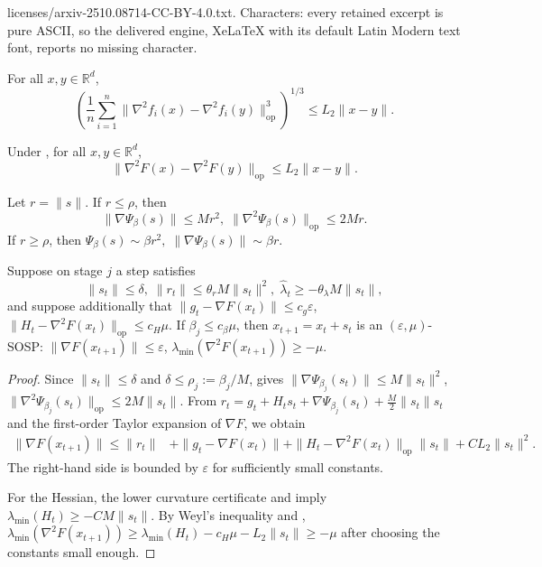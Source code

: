 \documentclass[10pt,a4paper]{amsart}
\begin{document}
licenses/arxiv-2510.08714-CC-BY-4.0.txt. Characters: every retained excerpt is pure ASCII, so the delivered engine, XeLaTeX with its default Latin Modern text font, reports no missing character.
\begin{assumption}\label{ass:H}
For all \(x,y\in\mathbb R^d\),
\[
\textstyle \left(\frac1n\sum_{i=1}^n
\|\nabla^2 f_i(x)-\nabla^2 f_i(y)\|_{\mathrm{op}}^3\right)^{1/3}
\le L_2\|x-y\|.
\]
\end{assumption}

\begin{lemma}\label{lem:hess-lip}
Under , for all \(x,y\in\mathbb R^d\),
\[
\|\nabla^2F(x)-\nabla^2F(y)\|_{\mathrm{op}}
\le L_2\|x-y\|.
\]
\end{lemma}

\begin{lemma}\label{lem:psi-main}
Let \(r=\|s\|\). If \(r\le \rho\), then
\[
\|\nabla \Psi_\beta(s)\|\le Mr^2,
\;
\|\nabla^2 \Psi_\beta(s)\|_{\mathrm{op}}\le 2Mr.
\]
If \(r\ge \rho\), then $\Psi_\beta(s)\sim \beta r^2,
\;
\|\nabla \Psi_\beta(s)\|\sim \beta r$.
\end{lemma}

\begin{lemma}\label{lem:terminal-cert-main}
Suppose on stage \(j\) a step satisfies
\[
\|s_t\|\le \delta,\;
\|r_t\|\le \theta_r M\|s_t\|^2,\;
\widehat\lambda_t\ge -\theta_\lambda M\|s_t\|,
\]
and suppose additionally that
$\|g_t-\nabla F(x_t)\|\le c_g\varepsilon$,
$\|H_t-\nabla^2F(x_t)\|_{\mathrm{op}}\le c_H\mu$.
If \(\beta_j\le c_\beta\mu\), then $x_{t+1}=x_t+s_t$
is an \((\varepsilon,\mu)\)-SOSP: $
\|\nabla F(x_{t+1})\|\le \varepsilon$,
$\lambda_{\min}(\nabla^2F(x_{t+1}))\ge -\mu$.
\end{lemma}

\begin{proof}
Since \(\|s_t\|\le \delta\) and \(\delta\le \rho_j:=\beta_j/M\),  gives
$
\|\nabla\Psi_{\beta_j}(s_t)\|\le M\|s_t\|^2$,
$
\|\nabla^2\Psi_{\beta_j}(s_t)\|_{\mathrm{op}}\le 2M\|s_t\|$. From $r_t
=
g_t+H_t s_t+\nabla\Psi_{\beta_j}(s_t)+\frac M2\|s_t\|s_t$
and the first-order Taylor expansion of \(\nabla F\), we obtain
\begin{align*}
\|\nabla F(x_{t+1})\|
\le
\|r_t\|
&+\|g_t-\nabla F(x_t)\| +\|H_t-\nabla^2F(x_t)\|_{\mathrm{op}}\|s_t\|+C L_2\|s_t\|^2.
\end{align*}
The right-hand side is bounded by \(\varepsilon\) for sufficiently small constants.

For the Hessian, the lower curvature certificate and  imply $\lambda_{\min}(H_t)\ge -C M\|s_t\|$.
By Weyl's inequality and ,
$
\lambda_{\min}(\nabla^2F(x_{t+1}))
\ge
\lambda_{\min}(H_t)-c_H\mu-L_2\|s_t\|
\ge -\mu
$
after choosing the constants small enough.
\end{proof}
\end{document}
